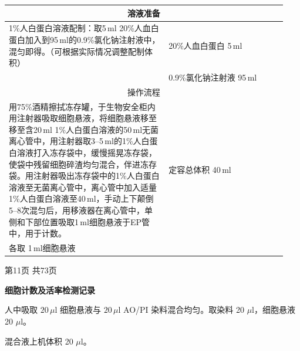 \documentclass[UTF8,10pt,a4paper,fontset=fandol]{ctexart}
\newcommand{\fieldvalue}[1]{#1}
\newcommand{\handwritten}[1]{#1}
\begin{document}
\begin{center}
\small
\begin{tabular}{|p{0.54\linewidth}|p{0.40\linewidth}|}
\hline
\multicolumn{2}{|c|}{溶液准备}\\
\hline
1\%人白蛋白溶液配制：取5\,ml 20\%人血白蛋白加入到95\,ml的0.9\%氯化钠注射液中，混匀即得。（可根据实际情况调整配制体积） &
20\%人血白蛋白\quad
\fieldvalue{\handwritten{5}}\,ml\\
&
0.9\%氯化钠注射液\quad
\fieldvalue{\handwritten{95}}\,ml\\
\hline
\multicolumn{2}{|c|}{操作流程}\\
\hline
用75\%酒精擦拭冻存罐，于生物安全柜内用注射器吸取细胞悬液，将细胞悬液移至移至含20\,ml 1\%人白蛋白溶液的50\,ml无菌离心管中，用注射器取3--5\,ml的1\%人白蛋白溶液打入冻存袋中，缓慢摇晃冻存袋，使袋中残留细胞碎渣均匀混合，伴进冻存袋。用注射器吸出冻存袋中的1\%人白蛋白溶液至无菌离心管中，离心管中加入适量1\%人白蛋白溶液至40\,ml，手动上下颠倒5--8次混匀后，用移液器在离心管中，单侧和下部位置吸取1\,ml细胞悬液于EP管中，用于计数。 &
定容总体积\quad
\fieldvalue{\handwritten{40}}\,ml\\[1ex]
各取\quad
\fieldvalue{\handwritten{1}}\,ml细胞悬液\\
\hline
\end{tabular}
\end{center}

\begin{center}
第11页 共73页
\end{center}

\newpage

\begin{center}
\textbf{细胞计数及活率检测记录}
\end{center}

人中吸取 $20\,\mu\mathrm{l}$ 细胞悬液与 $20\,\mu\mathrm{l}$ AO/PI 染料混合均匀。取染料
\fieldvalue{\handwritten{20}} $\mu\mathrm{l}$，细胞悬液
\fieldvalue{\handwritten{20}} $\mu\mathrm{l}$。

混合液上机体积
\fieldvalue{\handwritten{20}} $\mu\mathrm{l}$。
\end{document}
